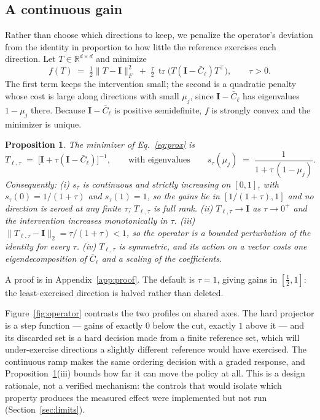 \documentclass{article}
\newcommand{\R}{\mathbb{R}}
\newcommand{\I}{\mathbf{I}}
\newcommand{\Cbar}{\bar C}
\DeclareMathOperator{\tr}{tr}
\newtheorem{proposition}{Proposition}
\begin{document}
\subsection{A continuous gain}
\label{sec:gain}

Rather than choose which directions to keep, we penalize the operator's deviation from the identity in proportion to how little the reference exercises each direction. Let $T\in\R^{d\times d}$ and minimize
\begin{equation}
\label{eq:prox}
f(T) \;=\; \tfrac12\|T-\I\|_F^2 \;+\; \tfrac{\tau}{2}\,\tr\!\bigl(T(\I-\Cbar_\ell)T^\top\bigr),
\qquad \tau>0 .
\end{equation}
The first term keeps the intervention small; the second is a quadratic penalty whose cost is large along directions with small $\mu_j$, since $\I-\Cbar_\ell$ has eigenvalues $1-\mu_j$ there. Because $\I-\Cbar_\ell$ is positive semidefinite, $f$ is strongly convex and the minimizer is unique.

\begin{proposition}
\label{prop:gain}
The minimizer of Eq.~\eqref{eq:prox} is
\begin{equation}
\label{eq:T}
T_{\ell,\tau} \;=\; \bigl[\I+\tau(\I-\Cbar_\ell)\bigr]^{-1},
\qquad\text{with eigenvalues}\qquad
s_\tau(\mu_j) \;=\; \frac{1}{1+\tau\,(1-\mu_j)} .
\end{equation}
Consequently: \emph{(i)} $s_\tau$ is continuous and strictly increasing on $[0,1]$, with $s_\tau(0)=1/(1+\tau)$ and $s_\tau(1)=1$, so the gains lie in $[1/(1+\tau),1]$ and \emph{no direction is zeroed at any finite $\tau$}; $T_{\ell,\tau}$ is full rank. \emph{(ii)} $T_{\ell,\tau}\to\I$ as $\tau\to0^{+}$ and the intervention increases monotonically in $\tau$. \emph{(iii)} $\|T_{\ell,\tau}-\I\|_2 = \tau/(1+\tau) < 1$, so the operator is a bounded perturbation of the identity for every $\tau$. \emph{(iv)} $T_{\ell,\tau}$ is symmetric, and its action on a vector costs one eigendecomposition of $\Cbar_\ell$ and a scaling of the coefficients.
\end{proposition}

\noindent A proof is in Appendix~\ref{app:proof}. The default is $\tau=1$, giving gains in $[\tfrac12,1]$: the least-exercised direction is halved rather than deleted.

Figure~\ref{fig:operator} contrasts the two profiles on shared axes. The hard projector is a step function --- gains of exactly $0$ below the cut, exactly $1$ above it --- and its discarded set is a hard decision made from a finite reference set, which will under-exercise directions a slightly different reference would have exercised. The continuous ramp makes the same ordering decision with a graded response, and Proposition~\ref{prop:gain}(iii) bounds how far it can move the policy at all. This is a design rationale, not a verified mechanism: the controls that would isolate which property produces the measured effect were implemented but not run (Section~\ref{sec:limits}).
\end{document}

